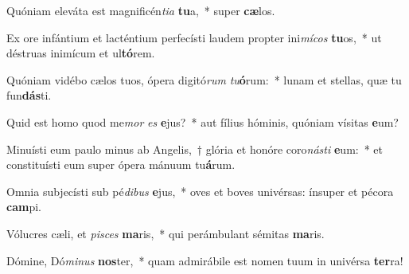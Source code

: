 \item Quóniam eleváta est magnificén\textit{ti}\textit{a} \textbf{tu}a,~* super \textbf{cæ}los.
\item Ex ore infántium et lacténtium perfecísti laudem propter ini\textit{mí}\textit{cos} \textbf{tu}os,~* ut déstruas inimícum et ul\textbf{tó}rem.
\item Quóniam vidébo cælos tuos, ópera digitó\textit{rum} \textit{tu}\textbf{ó}rum:~* lunam et stellas, quæ tu fun\textbf{dás}ti.
\item Quid est homo quod me\textit{mor} \textit{es} \textbf{e}jus?~* aut fílius hóminis, quóniam vísitas \textbf{e}um?
\item Minuísti eum paulo minus ab Angelis,~† glória et honóre coro\textit{nás}\textit{ti} \textbf{e}um:~* et constituísti eum super ópera mánuum tu\textbf{á}rum.
\item Omnia subjecísti sub pé\textit{di}\textit{bus} \textbf{e}jus,~* oves et boves univérsas: ínsuper et pécora \textbf{cam}pi.
\item Vólucres cæli, et \textit{pi}\textit{sces} \textbf{ma}ris,~* qui perámbulant sémitas \textbf{ma}ris.
\item Dómine, Dó\textit{mi}\textit{nus} \textbf{nos}ter,~* quam admirábile est nomen tuum in univérsa \textbf{ter}ra!
